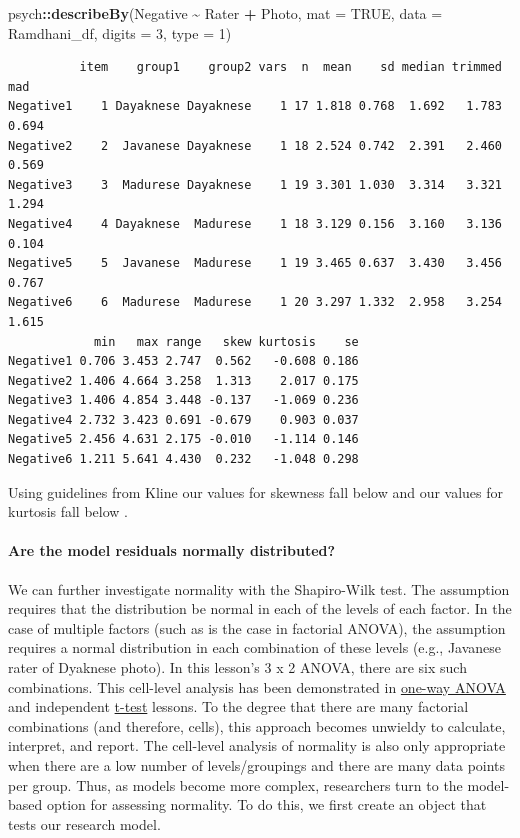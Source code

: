\documentclass[
  11pt,
]{book}
\newenvironment{Shaded}{\begin{snugshade}}{\end{snugshade}}
\newcommand{\AttributeTok}[1]{\textcolor[rgb]{0.27,0.27,0.27}{#1}}
\newcommand{\ConstantTok}[1]{\textcolor[rgb]{0.37,0.37,0.37}{#1}}
\newcommand{\DecValTok}[1]{\textcolor[rgb]{0.06,0.06,0.06}{#1}}
\newcommand{\FunctionTok}[1]{\textcolor[rgb]{0.27,0.27,0.27}{\textbf{#1}}}
\newcommand{\NormalTok}[1]{#1}
\newcommand{\SpecialCharTok}[1]{\textcolor[rgb]{0.43,0.43,0.43}{\textbf{#1}}}
\begin{document}
\begin{Shaded}
\begin{Highlighting}[]
\NormalTok{psych}\SpecialCharTok{::}\FunctionTok{describeBy}\NormalTok{(Negative }\SpecialCharTok{\textasciitilde{}}\NormalTok{ Rater }\SpecialCharTok{+}\NormalTok{ Photo, }\AttributeTok{mat =} \ConstantTok{TRUE}\NormalTok{, }\AttributeTok{data =}\NormalTok{ Ramdhani\_df,}
    \AttributeTok{digits =} \DecValTok{3}\NormalTok{, }\AttributeTok{type =} \DecValTok{1}\NormalTok{)}
\end{Highlighting}
\end{Shaded}

\begin{verbatim}
          item    group1    group2 vars  n  mean    sd median trimmed   mad
Negative1    1 Dayaknese Dayaknese    1 17 1.818 0.768  1.692   1.783 0.694
Negative2    2  Javanese Dayaknese    1 18 2.524 0.742  2.391   2.460 0.569
Negative3    3  Madurese Dayaknese    1 19 3.301 1.030  3.314   3.321 1.294
Negative4    4 Dayaknese  Madurese    1 18 3.129 0.156  3.160   3.136 0.104
Negative5    5  Javanese  Madurese    1 19 3.465 0.637  3.430   3.456 0.767
Negative6    6  Madurese  Madurese    1 20 3.297 1.332  2.958   3.254 1.615
            min   max range   skew kurtosis    se
Negative1 0.706 3.453 2.747  0.562   -0.608 0.186
Negative2 1.406 4.664 3.258  1.313    2.017 0.175
Negative3 1.406 4.854 3.448 -0.137   -1.069 0.236
Negative4 2.732 3.423 0.691 -0.679    0.903 0.037
Negative5 2.456 4.631 2.175 -0.010   -1.114 0.146
Negative6 1.211 5.641 4.430  0.232   -1.048 0.298
\end{verbatim}

Using guidelines from Kline \citeyearpar{kline_principles_2016} our values for skewness fall below \textbar{} and our values for kurtosis fall below \textbar.

\hypertarget{are-the-model-residuals-normally-distributed}{%
\paragraph{Are the model residuals normally distributed?}\label{are-the-model-residuals-normally-distributed}}

We can further investigate normality with the Shapiro-Wilk test. The assumption requires that the distribution be normal in each of the levels of each factor. In the case of multiple factors (such as is the case in factorial ANOVA), the assumption requires a normal distribution in each combination of these levels (e.g., Javanese rater of Dyaknese photo). In this lesson's 3 x 2 ANOVA, there are six such combinations. This cell-level analysis has been demonstrated in \protect\hyperlink{oneway}{one-way ANOVA} and independent \protect\hyperlink{tIndSample}{t-test} lessons. To the degree that there are many factorial combinations (and therefore, cells), this approach becomes unwieldy to calculate, interpret, and report. The cell-level analysis of normality is also only appropriate when there are a low number of levels/groupings and there are many data points per group. Thus, as models become more complex, researchers turn to the model-based option for assessing normality. To do this, we first create an object that tests our research model.
\end{document}
